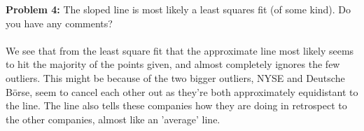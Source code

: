 \documentclass[12pt]{article}
\begin{document}
\newpage
\noindent \textbf{Problem 4: } The sloped line is most likely a least squares fit (of some kind). Do you have any
comments? 
\\ \\
We see that from the least square fit that the approximate line most likely seems to hit the majority of the points given, and almost completely ignores the few outliers.  This might be because of the two bigger outliers, NYSE and Deutsche Börse, seem to cancel each other out as they're both approximately equidistant to the line.  The line also tells these companies how they are doing in retrospect to the other companies, almost like an 'average' line.
\end{document}
